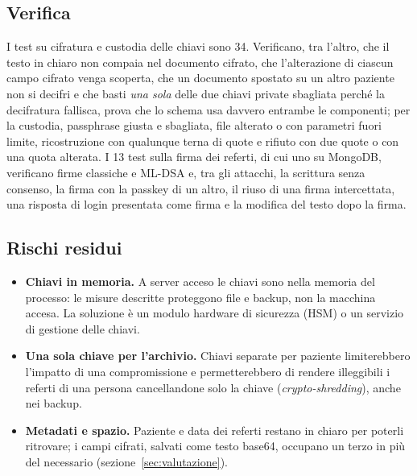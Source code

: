 \subsection{Verifica}
I test su cifratura e custodia delle chiavi sono 34. Verificano, tra l'altro, che il testo in chiaro non compaia nel documento cifrato, che l'alterazione di ciascun campo cifrato venga scoperta, che un documento spostato su un altro paziente non si decifri e che basti \emph{una sola} delle due chiavi private sbagliata perché la decifratura fallisca, prova che lo schema usa davvero entrambe le componenti; per la custodia, passphrase giusta e sbagliata, file alterato o con parametri fuori limite, ricostruzione con qualunque terna di quote e rifiuto con due quote o con una quota alterata. I 13 test sulla firma dei referti, di cui uno su MongoDB, verificano firme classiche e ML-DSA e, tra gli attacchi, la scrittura senza consenso, la firma con la passkey di un altro, il riuso di una firma intercettata, una risposta di login presentata come firma e la modifica del testo dopo la firma.

\subsection{Rischi residui}
\begin{itemize}
  \item \textbf{Chiavi in memoria.} A server acceso le chiavi sono nella memoria del processo: le misure descritte proteggono file e backup, non la macchina accesa. La soluzione è un modulo hardware di sicurezza (HSM) o un servizio di gestione delle chiavi.
  \item \textbf{Una sola chiave per l'archivio.} Chiavi separate per paziente limiterebbero l'impatto di una compromissione e permetterebbero di rendere illeggibili i referti di una persona cancellandone solo la chiave (\emph{crypto-shredding}), anche nei backup.
  \item \textbf{Metadati e spazio.} Paziente e data dei referti restano in chiaro per poterli ritrovare; i campi cifrati, salvati come testo base64, occupano un terzo in più del necessario (sezione~\ref{sec:valutazione}).
\end{itemize}
